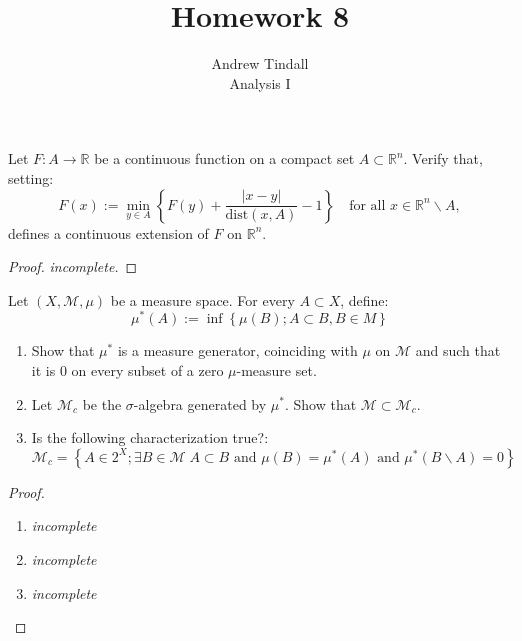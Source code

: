 \documentclass[12pt]{article}
\newcommand{\R}{\mathbb{R}}
\newcommand{\bs}{\backslash}
\theoremstyle{definition}
\newenvironment{problem}[2][Problem]{\begin{trivlist}
\item[\hskip \labelsep {\bfseries #1}\hskip \labelsep {\bfseries #2.}]}{\end{trivlist}}
\begin{document}
 
 
\title{Homework 8}
\author{Andrew Tindall\\
Analysis I}
 
\maketitle
\begin{problem}{1}
	Let $F : A \to \R$ be a continuous function on a compact set $A \subset \R^n$. Verify that, setting:
	\[F(x) := \min_{y \in A}\left\{ F(y) + \frac{\left \lvert { x - y } \right \lvert }{\text{dist}(x, A)} - 1 \right\} \quad \text{for all }x \in \R^n \backslash A,\]
	defines a continuous extension of $F$ on $\R^n$.
	\begin{proof}
		\textit{incomplete.}
	\end{proof}
\end{problem}
\begin{problem}{2}
	Let $(X, \mathcal{M}, \mu)$ be a measure space. For every $A \subset X$, define:
	\[\mu^*(A) := \inf\left\{ \mu(B); A \subset B, B \in M \right\}\]
	\begin{enumerate}[label=(\roman*)]
		\item Show that $\mu^*$ is a measure generator, coinciding with $\mu$ on $\mathcal{M}$ and such that it is $0$ on every subset of a zero $\mu$-measure set.
		\item Let $\mathcal{M}_c$ be the $\sigma$-algebra generated by $\mu^*$. Show that $\mathcal{M} \subset \mathcal{M}_c$.
		\item Is the following characterization true?:
			\[\mathcal{M}_c = \left\{ A \in 2^X; \exists B \in \mathcal{M} \; A \subset B \text{ and } \mu(B) = \mu^*(A) \text{ and } \mu^*(B \bs A) = 0 \right\}\]
	\end{enumerate}
			\begin{proof}
				\begin{enumerate}[label = (\roman*)]
					\item \textit{incomplete}
					\item \textit{incomplete}
					\item \textit{incomplete}
				\end{enumerate}
			\end{proof}
\end{problem}
\end{document}
